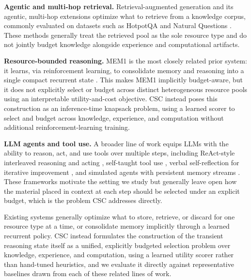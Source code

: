 \documentclass{article}
\begin{document}
\textbf{Agentic and multi-hop retrieval.} Retrieval-augmented generation \citep{lewis2020rag} and its agentic, multi-hop extensions optimize what to retrieve from a knowledge corpus, commonly evaluated on datasets such as HotpotQA \citep{yang2018hotpotqa} and Natural Questions \citep{kwiatkowski2019naturalquestions}. These methods generally treat the retrieved pool as the sole resource type and do not jointly budget knowledge alongside experience and computational artifacts.

\textbf{Resource-bounded reasoning.} MEM1 is the most closely related prior system: it learns, via reinforcement learning, to consolidate memory and reasoning into a single compact recurrent state \citep{zhou2025mem1}. This makes MEM1 implicitly budget-aware, but it does not explicitly select or budget across distinct heterogeneous resource pools using an interpretable utility-and-cost objective. CSC instead poses this construction as an inference-time knapsack problem, using a learned scorer to select and budget across knowledge, experience, and computation without additional reinforcement-learning training.

\textbf{LLM agents and tool use.} A broader line of work equips LLMs with the ability to reason, act, and use tools over multiple steps, including ReAct-style interleaved reasoning and acting \citep{yao2023react}, self-taught tool use \citep{schick2023toolformer}, verbal self-reflection for iterative improvement \citep{shinn2023reflexion}, and simulated agents with persistent memory streams \citep{park2023generative}. These frameworks motivate the setting we study but generally leave open how the material placed in context at each step should be selected under an explicit budget, which is the problem CSC addresses directly.

Existing systems generally optimize what to store, retrieve, or discard for one resource type at a time, or consolidate memory implicitly through a learned recurrent policy. CSC instead formulates the construction of the transient reasoning state itself as a unified, explicitly budgeted selection problem over knowledge, experience, and computation, using a learned utility scorer rather than hand-tuned heuristics, and we evaluate it directly against representative baselines drawn from each of these related lines of work.
\end{document}
